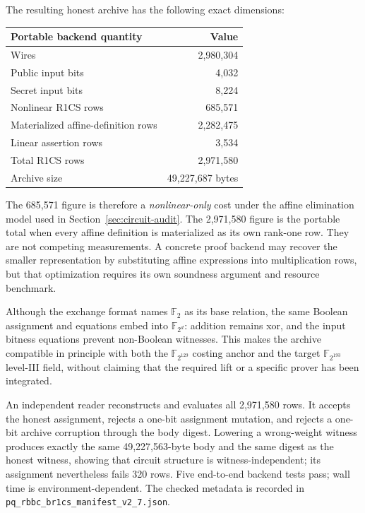 \documentclass[11pt]{article}
\begin{document}
The resulting honest archive has the following exact dimensions:
\begin{center}
\begin{tabular}{lr}
\toprule
Portable backend quantity & Value\\
\midrule
Wires & 2,980,304\\
Public input bits & 4,032\\
Secret input bits & 8,224\\
Nonlinear R1CS rows & 685,571\\
Materialized affine-definition rows & 2,282,475\\
Linear assertion rows & 3,534\\
Total R1CS rows & 2,971,580\\
Archive size & 49,227,687 bytes\\
\bottomrule
\end{tabular}
\end{center}
The 685,571 figure is therefore a \emph{nonlinear-only} cost under the affine
elimination model used in Section~\ref{sec:circuit-audit}.  The 2,971,580 figure
is the portable total when every affine definition is materialized as its own
rank-one row.  They are not competing measurements.  A concrete proof backend
may recover the smaller representation by substituting affine expressions into
multiplication rows, but that optimization requires its own soundness argument
and resource benchmark.

Although the exchange format names $\mathbb F_2$ as its base relation, the same
Boolean assignment and equations embed into $\mathbb F_{2^d}$: addition remains
xor, and the input bitness equations prevent non-Boolean witnesses.  This makes
the archive compatible in principle with both the $\mathbb F_{2^{129}}$
costing anchor and the target $\mathbb F_{2^{193}}$ level-III field, without
claiming that the required lift or a specific prover has been integrated.

An independent reader reconstructs and evaluates all 2,971,580 rows.  It
accepts the honest assignment, rejects a one-bit assignment mutation, and
rejects a one-bit archive corruption through the body digest.  Lowering a
wrong-weight witness produces exactly the same 49,227,563-byte body and the
same digest as the honest witness, showing that circuit structure is
witness-independent; its assignment nevertheless fails 320 rows.  Five
end-to-end backend tests pass; wall time is environment-dependent.  The checked
metadata is recorded in
\texttt{pq\_rbbc\_br1cs\_manifest\_v2\_7.json}.
\end{document}
